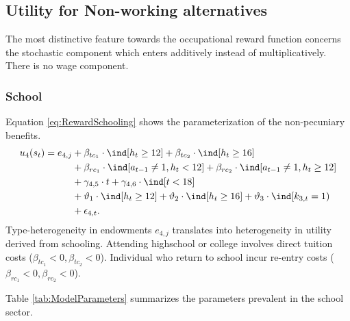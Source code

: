 \FloatBarrier\subsection{Utility for Non-working alternatives}
The most distinctive feature towards the occupational reward function concerns the stochastic component which enters additively instead of multiplicatively. There is no wage component.
\FloatBarrier\subsubsection{School}
Equation \ref{eq:RewardSchooling} shows the parameterization of the non-pecuniary benefits.
%
\begin{align}\label{eq:RewardSchooling}
	u_{4}(s_t) = e_{4,j} & + \beta_{tc_1} \cdot \ind[h_t \geq 12] + \beta_{tc_2} \cdot \ind[h_t \geq 16] 														\nonumber \\
    							  & + \beta_{rc_1} \cdot \ind[a_{t-1} \neq 1, h_t < 12] + \beta_{rc_2} \cdot \ind[a_{t-1} \neq 1, h_t \geq 12] 			   \nonumber \\
    							  & + \gamma_{4,5} \cdot t + \gamma_{4,6} \cdot \ind[t < 18] 																					  \nonumber \\
     							  & + \vartheta_1 \cdot \ind[h_t \geq 12] + \vartheta_2 \cdot \ind[h_t \geq 16] + \vartheta_3 \cdot \ind[k_{3,t} = 1) \nonumber \\
      							  & + \epsilon_{4,t}.
\end{align}
%
Type-heterogeneity in endowments $e_{4,j}$ translates into heterogeneity in utility derived from schooling. Attending highschool or college involves direct tuition costs ($\beta_{tc_1} < 0, \beta_{tc_2} <0$). Individual who return to school incur re-entry costs ($\beta_{rc_1} <0 , \beta_{rc_2} < 0$).

Table \ref{tab:ModelParameters} summarizes the parameters prevalent in the school sector.


